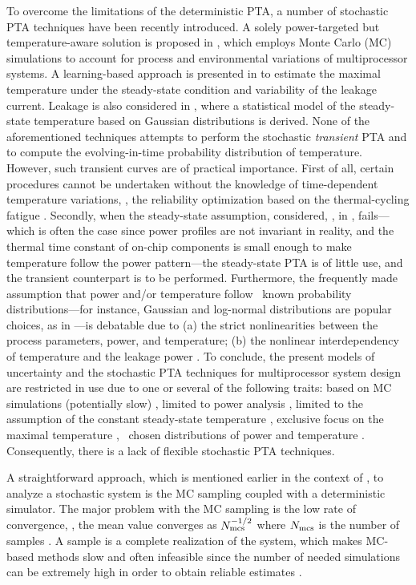 To overcome the limitations of the deterministic PTA, a number of stochastic PTA techniques have been recently introduced. A solely power-targeted but temperature-aware solution is proposed in \cite{chandra2010}, which employs Monte Carlo (MC) simulations to account for process and environmental variations of multiprocessor systems. A learning-based approach is presented in \cite{juan2011} to estimate the maximal temperature under the steady-state condition and variability of the leakage current. Leakage is also considered in \cite{juan2012}, where a statistical model of the steady-state temperature based on Gaussian distributions is derived. None of the aforementioned techniques attempts to perform the stochastic \emph{transient} PTA and to compute the evolving-in-time probability distribution of temperature. However, such transient curves are of practical importance. First of all, certain procedures cannot be undertaken without the knowledge of time-dependent temperature variations, \eg, the reliability optimization based on the thermal-cycling fatigue \cite{ukhov2012}. Secondly, when the steady-state assumption, considered, \eg, in \cite{juan2011, juan2012}, fails---which is often the case since power profiles are not invariant in reality, and the thermal time constant of on-chip components is small enough to make temperature follow the power pattern---the steady-state PTA is of little use, and the transient counterpart is to be performed. Furthermore, the frequently made assumption that power and/or temperature follow \apriori\ known probability distributions---for instance, Gaussian and log-normal distributions are popular choices, as in \cite{juan2012, srivastava2010}---is debatable due to (a) the strict nonlinearities between the process parameters, power, and temperature; (b) the nonlinear interdependency of temperature and the leakage power \cite{liu2007}. To conclude, the present models of uncertainty and the stochastic PTA techniques for multiprocessor system design are restricted in use due to one or several of the following traits: based on MC simulations (potentially slow) \cite{chandra2010}, limited to power analysis \cite{chandra2010}, limited to the assumption of the constant steady-state temperature \cite{juan2011, juan2012}, exclusive focus on the maximal temperature \cite{juan2011}, \apriori\ chosen distributions of power and temperature \cite{juan2012, srivastava2010}. Consequently, there is a lack of flexible stochastic PTA techniques.

A straightforward approach, which is mentioned earlier in the context of \cite{chandra2010}, to analyze a stochastic system is the MC sampling coupled with a deterministic simulator. The major problem with the MC sampling is the low rate of convergence, \eg, the mean value converges as $N_\text{mcs}^{-{{1}/{2}}}$ where $N_\text{mcs}$ is the number of samples \cite{xiu2010, maitre2010}. A sample is a complete realization of the system, which makes MC-based methods slow and often infeasible since the number of needed simulations can be extremely high in order to obtain reliable estimates \cite{diaz-emparanza2002}.

